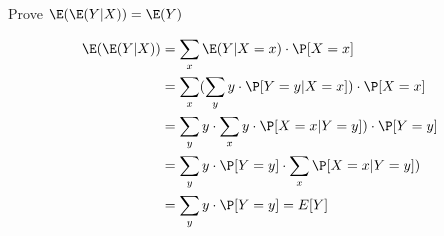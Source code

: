 \question Prove $\E(\E(Y|X)) = \E(Y)$
\begin{solution}[1.5 cm]
\begin{align*}
\E(\E(Y|X)) &= \sum_x \E(Y | X = x) \cdot \P[X = x] \\
&= \sum_x (\sum_y y \cdot \P[Y=y|X=x]) \cdot \P[X = x] \\
&= \sum_y y \cdot  \sum_x y \cdot \P[X=x|Y=y]) \cdot \P[Y=y] \\
&= \sum_y y \cdot \P[Y=y] \cdot \sum_x \P[X=x|Y=y]) \\
&= \sum_y y \cdot \P[Y=y] = E[Y]
\end{align*}
\end{solution}